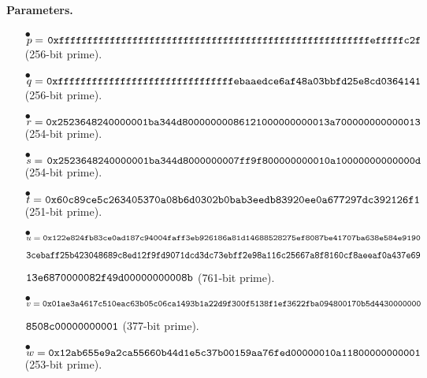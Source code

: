 \paragraph{Parameters.}

\begin{itemize}
	\item[$\bullet$] $p = \tt{\hspace{0.04cm}0xfffffffffffffffffffffffffffffffffffffffffffffffffffffffefffffc2f}$ (256-bit prime).
	\item[$\bullet$] $q = \tt{\hspace{0.01cm}0xfffffffffffffffffffffffffffffffebaaedce6af48a03bbfd25e8cd0364141}$ (256-bit prime).	
	\item[$\bullet$] $r = \tt{0x2523648240000001ba344d80000000086121000000000013a700000000000013}$ (254-bit prime).
	\item[$\bullet$] $s = \tt{\hspace{0.04cm}0x2523648240000001ba344d8000000007ff9f800000000010a10000000000000d}$ (254-bit prime).
	\item[$\bullet$] $t = \tt{\hspace{0.01cm}0x60c89ce5c263405370a08b6d0302b0bab3eedb83920ee0a677297dc392126f1}$ (251-bit prime).
	\item[$\bullet$] $u = \tt{0x122e824fb83ce0ad187c94004faff3eb926186a81d14688528275ef8087be41707ba638e584e9190}$
	\item[] \hspace{0.53cm} $\tt{3cebaff25b423048689c8ed12f9fd9071dcd3dc73ebff2e98a116c25667a8f8160cf8aeeaf0a437e69}$
	\item[] \hspace{0.53cm} $\tt{13e6870000082f49d00000000008b}$ (761-bit prime).
	\item[$\bullet$] $v = \tt{0x01ae3a4617c510eac63b05c06ca1493b1a22d9f300f5138f1ef3622fba094800170b5d4430000000}$
	\item[] \hspace{0.52cm} $\tt{8508c00000000001}$ (377-bit prime).
	\item[$\bullet$] $w = \tt{0x12ab655e9a2ca55660b44d1e5c37b00159aa76fed00000010a11800000000001}$ (253-bit prime).
\end{itemize}

